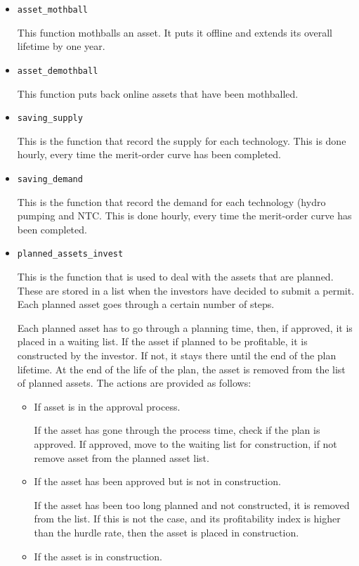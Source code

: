 \begin{itemize}
\item \texttt{asset\_mothball}

This function mothballs an asset. It puts it offline and extends its overall lifetime by one year.

\item \texttt{asset\_demothball}

This function puts back online assets that have been mothballed.

\item \texttt{saving\_supply}

This is the function that record the supply for each technology. This is done hourly, every time the merit-order curve has been completed.

\item \texttt{saving\_demand}

This is the function that record the demand for each technology (hydro pumping and NTC. This is done hourly, every time the merit-order curve has been completed.

\item \texttt{planned\_assets\_invest}

This is the function that is used to deal with the assets that are planned. These are stored in a list when the investors have decided to submit a permit. Each planned asset goes through a certain number of steps.

Each planned asset has to go through a planning time, then, if approved, it is placed in a waiting list. If the asset if planned to be profitable, it is constructed by the investor. If not, it stays there until the end of the plan lifetime. At the end of the life of the plan, the asset is removed from the list of planned assets. The actions are provided as follows:

	\begin{itemize}
	\item If asset is in the approval process.
	
	If the asset has gone through the process time, check if the plan is approved. If approved, move to the waiting list for construction, if not remove asset from the planned asset list.
	\item If the asset has been approved but is not in construction.
	
	If the asset has been too long planned and not constructed, it is removed from the list. If this is not the case, and its profitability index is higher than the hurdle rate, then the asset is placed in construction.
	\item If the asset is in construction.
	

\end{itemize}
\end{itemize}

